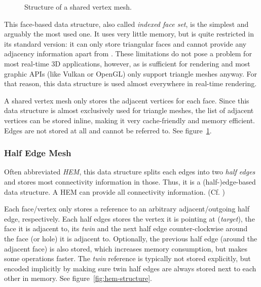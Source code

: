 \begin{figure}[h]
  \vspace{2mm}
  \caption{Structure of a shared vertex mesh.}
  \label{fig:sv-structure}
\end{figure}

This face-based data structure, also called \emph{indexed face set}, is the simplest and arguably the most used one.
It uses very little memory, but is quite restricted in its standard version:
it can only store triangular faces and cannot provide any adjacency information apart from .
These limitations do not pose a problem for most real-time 3D applications, however, as  is sufficient for rendering and most graphic APIs (like Vulkan or OpenGL) only support triangle meshes anyway.
For that reason, this data structure is used almost everywhere in real-time rendering.

A shared vertex mesh only stores the adjacent vertices for each face.
Since this data structure is almost exclusively used for triangle meshes, the list of adjacent vertices can be stored inline, making it very cache-friendly and memory efficient.
Edges are not stored at all and cannot be referred to. See figure~\ref{fig:sv-structure}.


\subsubsection*{Half Edge Mesh}

Often abbreviated \emph{HEM}, this data structure splits each edges into two \emph{half edges} and stores most connectivity information in those. Thus, it is a (half-)edge-based data structure.
A HEM can provide all connectivity information. (Cf. \cite{mantyla1988introduction})

Each face/vertex only stores a reference to an arbitrary adjacent/outgoing half edge, respectively.
Each half edges stores the vertex it is pointing at (\emph{target}), the face it is adjacent to, its \emph{twin} and the next half edge counter-clockwise around the face (or hole) it is adjacent to.
Optionally, the previous half edge (around the adjacent face) is also stored, which increases memory consumption, but makes some operations faster.
The \emph{twin} reference is typically not stored explicitly, but encoded implicitly by making sure twin half edges are always stored next to each other in memory.
See figure~\ref{fig:hem-structure}.

